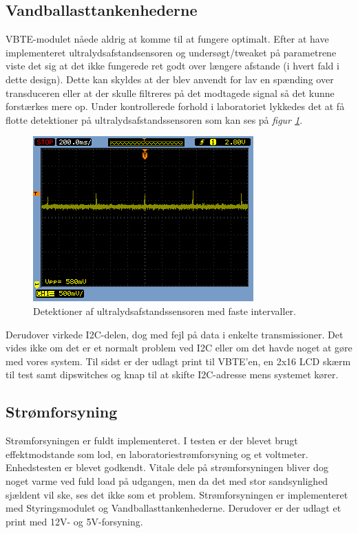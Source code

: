 \subsection{Vandballasttankenhederne}
VBTE-modulet nåede aldrig at komme til at fungere optimalt. Efter at have implementeret ultralydsafstandsensoren  og undersøgt/tweaket på parametrene viste det sig at det ikke fungerede ret godt over længere afstande (i hvert fald i dette design). Dette kan skyldes at der blev anvendt for lav en spænding over transduceren eller at der skulle filtreres på det modtagede signal så det kunne forstærkes mere op. Under kontrollerede forhold i laboratoriet lykkedes det at få flotte detektioner på ultralydsafstandssensoren som kan ses på \textit{figur \ref{res:ultraresultater}}.
\begin{figure}[H]
\centering
\includegraphics[width = .5\textwidth]{billeder/mixer2}
\caption{Detektioner af ultralydsafstandssensoren med faste intervaller.}
\label{res:ultraresultater}
\end{figure}
Derudover virkede I2C-delen, dog med fejl på data i enkelte transmissioner. Det vides ikke om det er et normalt problem ved I2C eller om det havde noget at gøre med vores system. Til sidst er der udlagt print til VBTE'en, en 2x16 LCD skærm til test samt dipswitches og knap til at skifte I2C-adresse mens systemet kører. 

\subsection{Strømforsyning}
Strømforsyningen er fuldt implementeret. I testen er der blevet brugt effektmodstande som lod, en laboratoriestrømforsyning og et voltmeter. Enhedstesten er blevet godkendt. Vitale dele på strømforsyningen bliver dog noget varme ved fuld load på udgangen, men da det med stor sandsynlighed sjældent vil ske, ses det ikke som et problem. Strømforsyningen er implementeret med Styringsmodulet og Vandballasttankenhederne. Derudover er der udlagt et print med 12V- og 5V-forsyning.

